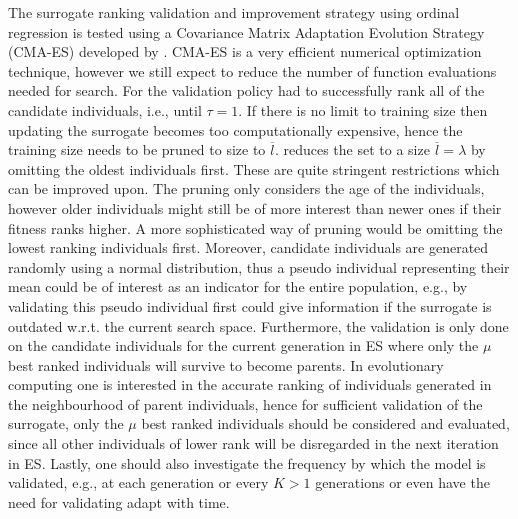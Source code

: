 The surrogate ranking validation and improvement strategy using ordinal regression is tested using a Covariance Matrix Adaptation Evolution Strategy (CMA-ES) developed by \cite{Hansen01}. CMA-ES is a very efficient numerical optimization technique, however we still expect to reduce the number of function evaluations needed for search. For \cite{Ru06:PPSN} the validation policy had to successfully rank all of the candidate individuals, i.e.,  until $\tau=1$. %
If there is no limit to training size then updating the surrogate becomes too computationally expensive, hence the training size needs to be pruned to size to $\overline{l}$. %
\citeauthor{Ru06:PPSN} reduces the set to a size $\overline{l} = \lambda$ by omitting the oldest individuals first. These are quite stringent restrictions which can be improved upon. 
The pruning only considers the age of the individuals, however older individuals might still be of more interest than newer ones if their fitness ranks higher. A more sophisticated way of pruning would be omitting the lowest ranking individuals first. 
Moreover, candidate individuals are generated randomly using a normal distribution, thus a pseudo individual representing their mean could be of interest as an indicator for the entire population, e.g., by validating this pseudo individual first could give information if the surrogate is outdated w.r.t. the current search space. 
Furthermore, the validation is only done on the candidate individuals for the current generation in ES where only the $\mu$ best ranked individuals will survive to become parents. In evolutionary computing one is interested in the accurate ranking of individuals  generated in the neighbourhood of parent individuals, hence for sufficient validation of the surrogate, only the $\mu$ best ranked individuals  should be considered and evaluated, since all other individuals  of lower rank will be disregarded in the next iteration in ES. 
Lastly, one should also investigate the frequency by which the model is validated, e.g., at each generation or every $K>1$ generations or even have the need for validating adapt with time.

